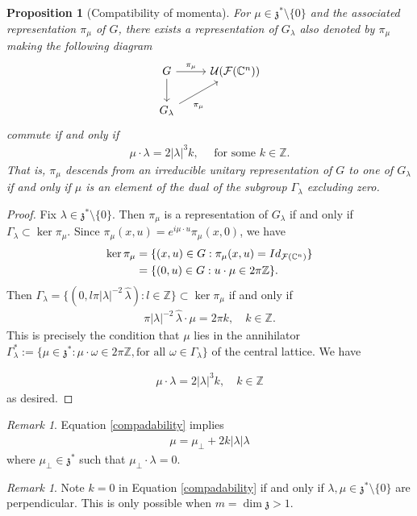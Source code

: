 \documentclass[11pt]{amsart}
\theoremstyle{plain}
\newtheorem{proposition}[theorem]{Proposition}
\theoremstyle{definition}
\theoremstyle{remark}
\newtheorem{remark}[theorem]{Remark}
\numberwithin{equation}{section}
\def\fz{\mathfrak{z}}
\def\cU{\mathcal{U}}
\def\cF{\mathcal{F}}
\def\mz{\setminus\{0\}}
\def\C{{\mathbb C}}%
\def\Z{{\mathbb Z}}%
\numberwithin{equation}{section}
\begin{document}
\begin{proposition}[Compatibility of momenta]\label{propCompatibility}
	For $\mu\in \fz^*\mz$ and the associated representation $\pi_\mu$ of $G$,  there exists a representation  of $G_\lambda$ also denoted by $\pi_\mu$ making the following diagram
	\[ 
	\begin{tikzcd}
		G \arrow[d]  \arrow[r, "\pi_\mu"]  & \cU(\cF(\C^n))\\
		G_{\lambda} \arrow[ur, "\pi_\mu" below=7, pos=0.5]
	\end{tikzcd}
	\]
	commute if and only if 
	\begin{align*}
		\mu\cdot \lambda=2|\lambda|^3k, \quad \text{ for some } k\in \Z. 
	\end{align*}
	That is, $\pi_\mu$ descends from an irreducible unitary representation of $G$ to one of  $G_\lambda$ if and only if $\mu$ is an element of the dual of the subgroup $\Gamma_\lambda$ excluding zero. 	
\end{proposition}
\begin{proof}
	Fix $\lambda\in \fz^*\mz$. Then $\pi_\mu$ is a representation of $G_\lambda$ if and only if $\Gamma_\lambda\subset \ker{\pi_\mu}$. Since $\pi_\mu(x, u)=e^{i\mu\cdot u}\pi_\mu(x, 0)$, we have 
	\begin{align*}
		\ker\pi_\mu 
		&=\{(x, u)\in G: \pi_\mu(x, u)={{\rm Id}}_{\cF(\C^n)}\}\\
		&=\{(0, u)\in G: u\cdot \mu\in 2\pi\Z \}.
	\end{align*}
	Then $\Gamma_\lambda=\{(0, l\pi|\lambda|^{-2}\, \hat{\lambda}): l\in \Z\}\subset \ker{\pi_\mu}$ if and only if
	\begin{align*}
		\pi |\lambda|^{-2}\,\hat{\lambda}\cdot \mu =2\pi k, \quad k\in \Z.
	\end{align*}
	This is precisely the condition that $\mu$ lies in the annihilator $\Gamma_\lambda^*:=\{\mu\in \fz^*: \mu\cdot\omega\in 2\pi \Z, \text{for all }\omega\in \Gamma_\lambda\}$ of the central lattice. We have
	
	

	\begin{align}
		\mu\cdot \lambda=2|\lambda|^3k, \quad k\in \mathbb{Z} \label{compadability}
	\end{align}
as desired. 
\end{proof}
\begin{remark}
	Equation \eqref{compadability} implies
		\begin{align*}
		\mu=\mu_\perp+2k|\lambda|\lambda
	\end{align*}
where $\mu_\perp\in \fz^*$ such that $\mu_\perp\cdot\lambda=0$. 
\end{remark}
\begin{remark}
	Note $k=0$ in Equation \eqref{compadability} if and only if $\lambda, \mu\in \fz^*\mz$ are perpendicular. This is only possible when $m=\dim \fz >1$. 
\end{remark}
\end{document}
